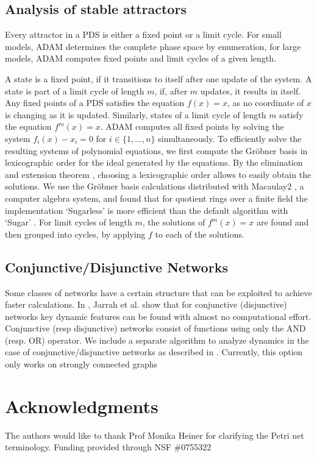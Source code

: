\documentclass[11pt]{amsart}
\begin{document}
\subsection{Analysis of stable attractors}
Every attractor in a PDS is either a
fixed point or a limit cycle. For small models, ADAM determines the complete
phase space by enumeration, for large models, ADAM computes fixed points and
limit cycles of a given length.
 
A state is a fixed point, if it transitions to itself after one update of the
system. A state is part of a limit cycle of length $m$, if,
after $m$ updates, it results in itself. Any fixed points of a PDS satisfies
the equation $f(x) = x$, as no coordinate of $x$ is changing as it is updated.
Similarly, states of a
limit cycle of length $m$ satisfy the equation $f^m(x) = x$. ADAM computes all
fixed points by solving the system $f_i(x) - x_i = 0$ for $i \in \{1, \ldots,
n\}$ simultaneously. To efficiently solve the resulting systems of polynomial
equations, we first compute the Gr\"obner
basis in lexicographic order for the ideal generated by the equations.
By the elimination and extension theorem \cite{IVA}, choosing a lexicographic order
allows to easily obtain the solutions.
We use the Gr\"obner basis calculations distributed with Macaulay2 \cite{M2}, a
computer algebra system, and found that for quotient rings over a finite field
the implementation `Sugarless' is more efficient than the default algorithm
with `Sugar' \cite{Sugar:1991}.
For limit cycles of length $m$, the solutions of $f^m(x)=x$ are found and then
grouped into cycles, by applying $f$ to each of the solutions.
 
\subsection{Conjunctive/Disjunctive Networks} \label{sec:conj}
Some classes of networks have a certain structure that can be
exploited to achieve faster calculations. In \cite{conjunctive}, Jarrah et al.
show that for conjunctive (disjunctive) networks key dynamic features can be found with
almost no computational effort. Conjunctive (resp disjunctive) networks consist of
functions using only the AND (resp. OR) operator.
We include a separate algorithm to analyze
dynamics in the case of conjunctive/disjunctive networks as described in
\cite{conjunctive}. Currently,
this option only works on strongly connected graphs
 
 
\section*{Acknowledgments}
The authors would like to thank Prof Monika Heiner for clarifying the Petri
net terminology. 
Funding provided through NSF \#0755322

%

\end{document}
